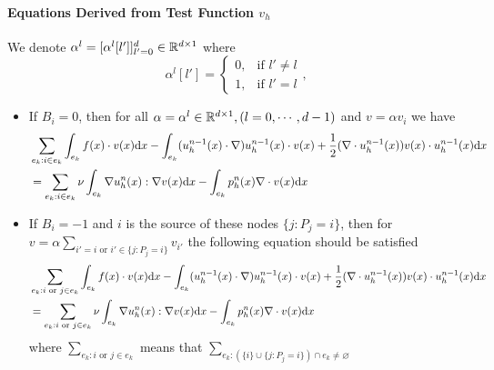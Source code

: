 \paragraph{Equations Derived from Test Function $v_h$}
We denote $\alpha^l=[\alpha^l[l']]_{l'=0}^d\in\mathbb{R}^{d\times1}$ where
\begin{equation}\label{eq:basis-alpha}
  \alpha^l[l']=\left\{
    \begin{array}{ll}
      0, & \text{if } l'\neq l \\
      1, & \text{if } l'=l
    \end{array}\right.,
\end{equation}
\begin{itemize}
  \item If $B_i=0$, then for all $\alpha=\alpha^l\in\mathbb{R}^{d\times1},(l=0,\cdots,d-1)$ and $v=\alpha v_{i}$ we have
    \begin{equation}\label{eq:equation-testv-interior}
      \begin{split}
        &\sum_{e_{k}:i\in e_{k}}\int_{e_{k}}f(x)\cdot v(x)\mathrm{d} x
        -\int_{e_{k}}(u_h^{n-1}(x)\cdot\nabla)u_h^{n-1}(x)\cdot v(x)+\frac{1}{2}(\nabla\cdot u_h^{n-1}(x))v(x)\cdot u_h^{n-1}(x)\mathrm{d} x \\
        &=\sum_{e_{k}:i\in e_{k}}\nu\int_{e_{k}}\nabla u_h^n(x):\nabla v(x)\mathrm{d} x-\int_{e_{k}}p_h^n(x)\nabla\cdot v(x)\mathrm{d} x 
      \end{split}
    \end{equation}
  \item If $B_i=-1$ and $i$ is the source of these nodes $\{j:P_j=i\}$, 
    then for $v=\alpha\sum_{i'=i\text{ or }i'\in\{j:P_j=i\}}v_{i'}$ the following equation should be satisfied
    \begin{equation}\label{eq:equation-testv-period}
      \begin{split}
        &\sum_{e_{k}:i\text{ or }j\in e_{k}}\int_{e_{k}}f(x)\cdot v(x)\mathrm{d} x
        -\int_{e_{k}}(u_h^{n-1}(x)\cdot\nabla)u_h^{n-1}(x)\cdot v(x)+\frac{1}{2}(\nabla\cdot u_h^{n-1}(x))v(x)\cdot u_h^{n-1}(x)\mathrm{d} x \\
        &=\sum_{e_{k}:i\text{ or }j\in e_{k}}\nu\int_{e_{k}}\nabla u_h^n(x):\nabla v(x)\mathrm{d} x-\int_{e_{k}}p_h^n(x)\nabla\cdot v(x)\mathrm{d} x 
      \end{split}
    \end{equation}
    where $\sum_{e_{k}:i\text{ or }j\in e_{k}}$ means that $\sum_{e_k:(\{i\}\cup\{j:P_j=i\})\cap e_k\neq\varnothing}$
\end{itemize}

